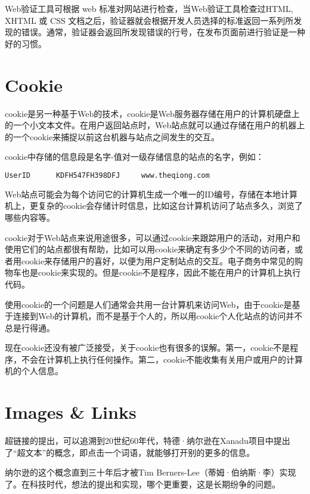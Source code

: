 Web验证工具可根据 web 标准对网站进行检查，当Web验证工具检查过HTML, XHTML 或 CSS 文档之后，验证器就会根据开发人员选择的标准返回一系列所发现的错误。通常，验证器会返回所发现错误的行号，在发布页面前进行验证是一种好的习惯。



\section{Cookie}



cookie是另一种基于Web的技术，cookie是Web服务器存储在用户的计算机硬盘上的一个小文本文件。在用户返回站点时，Web站点就可以通过存储在用户的机器上的一个cookie来捕捉以前这台机器与站点之间发生的交互。

cookie中存储的信息段是名字-值对一级存储信息的站点的名字，例如：

\begin{lstlisting}[language=HTML]
UserID		KDFH547FH398DFJ		www.theqiong.com
\end{lstlisting}

Web站点可能会为每个访问它的计算机生成一个唯一的ID编号，存储在本地计算机上，更复杂的cookie会存储计时信息，比如这台计算机访问了站点多久，浏览了哪些内容等。

cookie对于Web站点来说用途很多，可以通过cookie来跟踪用户的活动，对用户和使用它们的站点都很有帮助，比如可以用cookie来确定有多少个不同的访问者，或者用cookie来存储用户的喜好，以便为用户定制站点的交互。电子商务中常见的购物车也是cookie来实现的。但是cookie不是程序，因此不能在用户的计算机上执行代码。

使用cookie的一个问题是人们通常会共用一台计算机来访问Web，由于cookie是基于连接到Web的计算机，而不是基于个人的，所以用cookie个人化站点的访问并不总是行得通。

现在cookie还没有被广泛接受，关于cookie也有很多的误解。第一，cookie不是程序，不会在计算机上执行任何操作。第二，cookie不能收集有关用户或用户的计算机的个人信息。

\section{Images \& Links}

超链接的提出，可以追溯到20世纪60年代，特德·纳尔逊在Xanadu项目中提出了“超文本”的概念，即点击一个词语，就能够打开别的更多的信息。



纳尔逊的这个概念直到三十年后才被Tim Berners-Lee（蒂姆·伯纳斯·李）实现了。在科技时代，想法的提出和实现，哪个更重要，这是长期纷争的问题。


